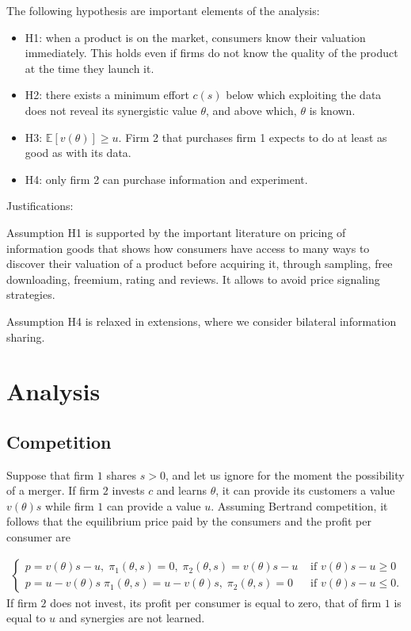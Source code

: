 \documentclass[a4paper,leqno]{article}%
\newcommand{\E}{\mathbb E}
\renewcommand{\t}{\theta}
\begin{document}
The following hypothesis are important elements of the analysis:

\begin{itemize}[label={--}]
    \item H1: when a product is on the market, consumers know their valuation immediately. This holds even if firms do not know the quality of the product at the time they launch it. 
    \item H2: there exists a minimum effort $c(s)$ below which exploiting the data does not reveal its synergistic value $\t$, and above which, $\t$ is known.
    \item H3: $\E[v(\t)]\geq u$. Firm 2 that purchases firm 1 expects to do at least as good as with its data. 
    \item H4: only firm 2 can purchase information and experiment.
\end{itemize}

Justifications:

Assumption H1 is supported by the important literature on pricing of information goods \citep{shapiro1998information} that shows how consumers have access to many ways to discover their valuation of a product before acquiring it, through sampling, free downloading, freemium, rating and reviews. It allows to avoid price signaling strategies.

Assumption H4 is relaxed in extensions, where we consider bilateral information sharing. 


\section{Analysis}

\subsection{Competition}


Suppose that firm $1$ shares $s>0$, and let us ignore for the moment the possibility of a merger. If firm $2$ invests $c$ and learns $\t$, it can provide its customers a value $v(\t)s$ while firm $1$ can provide a value $u$. Assuming Bertrand competition, it follows that the equilibrium price paid by the consumers and the profit per consumer are

\begin{align}\label{comp}
\begin{cases}
    p=v(\t)s-u,\; \pi_1(\t,s)=0,\; \pi_2(\t,s)=v(\t)s-u & \text{ if }v(\t)s-u\geq 0\\ 
    p=u-v(\t)s\; \pi_1(\t,s)=u-v(\t)s,\; \pi_2(\t,s)=0 & \text{ if }v(\t)s-u\leq 0.
\end{cases}
\end{align}
If firm $2$ does not invest, its profit per consumer is equal to zero, that of firm $1$ is equal to $u$ and synergies are not learned.
\end{document}
